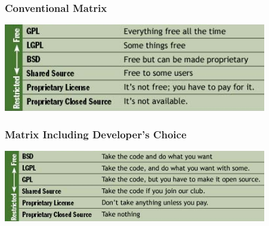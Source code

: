 
\begin{frame}
\frametitle{Conventional Matrix}

\begin{center}
\includegraphics[width=11.5cm]{figs/conventional_matrix.png}
\end{center}

\end{frame}


\begin{frame}
\frametitle{Matrix Including Developer's Choice}

\begin{center}
\includegraphics[width=11.5cm]{figs/matrix_developers_choice.png}
\end{center}

\end{frame}



